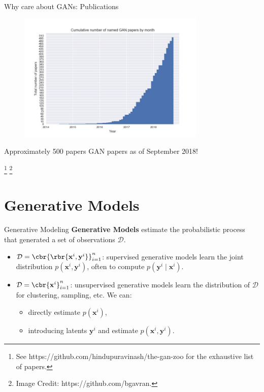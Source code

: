 \documentclass[notheorems]{beamer}
\newcommand{\source}[1]{{\let\thefootnote\relax\footnote{{\tiny #1}}}}
\newcommand{\xx}{\mathbf{x}}
\newcommand{\yy}{\mathbf{y}}
\begin{document}
    \begin{frame}{Why care about GANs: Publications}

        \begin{figure}
            \centering
            \includegraphics[width=0.8\textwidth]{figures/gan_papers}
        \end{figure}

        \begin{center} Approximately 500 papers GAN papers as of September 2018! \end{center}

        \source{See https://github.com/hindupuravinash/the-gan-zoo for the exhaustive list of papers.}
        \source{Image Credit: https://github.com/bgavran. }

    \end{frame}

    \section{Generative Models}

    \begin{frame}{Generative Modeling}
        \textbf{Generative Models} estimate the probabilistic process that generated a set of observations $\mathcal{D}$.
        \begin{itemize}
            \item $\mathcal{D} = \cbr{\rbr{\xx^i, \yy^i}}_{i=1}^n$: supervised generative models learn the joint distribution $p(\xx^i,\yy^i)$, often to compute $p(\yy^i \mid \xx^i)$.
            \item $\mathcal{D} = \cbr{\xx^i}_{i=1}^n$: unsupervised generative models learn the distribution of $\mathcal{D}$ for clustering, sampling, etc. We can:
            \begin{itemize}
                \item directly estimate $p(\xx^i)$,
                \item introducing latents $\yy^i$ and estimate $p(\xx^i, \yy^i)$.
            \end{itemize}
        \end{itemize}

    \end{frame}
\end{document}
